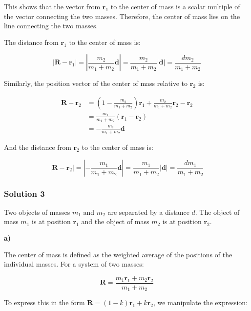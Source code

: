 \documentclass{article}
\begin{document}
This shows that the vector from $\mathbf{r}_1$ to the center of mass is a scalar multiple of the vector connecting the two masses.  Therefore, the center of mass lies on the line connecting the two masses.

The distance from $\mathbf{r}_1$ to the center of mass is:

\begin{equation*}
|\mathbf{R} - \mathbf{r}_1| = \left| \frac{m_2}{m_1 + m_2} \mathbf{d} \right| = \frac{m_2}{m_1 + m_2} |\mathbf{d}| = \frac{dm_2}{m_1 + m_2}
\end{equation*}

Similarly, the position vector of the center of mass relative to $\mathbf{r}_2$ is:

\begin{align*}
\mathbf{R} - \mathbf{r}_2 &= \left( 1 - \frac{m_2}{m_1 + m_2} \right) \mathbf{r}_1 + \frac{m_2}{m_1 + m_2} \mathbf{r}_2 - \mathbf{r}_2 \\
&= \frac{m_1}{m_1 + m_2} (\mathbf{r}_1 - \mathbf{r}_2) \\
&= -\frac{m_1}{m_1 + m_2} \mathbf{d}
\end{align*}

And the distance from $\mathbf{r}_2$ to the center of mass is:

\begin{equation*}
|\mathbf{R} - \mathbf{r}_2| = \left| -\frac{m_1}{m_1 + m_2} \mathbf{d} \right| = \frac{m_1}{m_1 + m_2} |\mathbf{d}| = \frac{dm_1}{m_1 + m_2}
\end{equation*}

\subsubsection{Solution 3}

Two objects of masses $m_1$ and $m_2$ are separated by a distance $d$. The object of mass $m_1$ is at position $\mathbf{r}_1$ and the object of mass $m_2$ is at position $\mathbf{r}_2$.

\textbf{a)} 

The center of mass is defined as the weighted average of the positions of the individual masses.  For a system of two masses:

\begin{equation*}
\mathbf{R} = \frac{m_1 \mathbf{r}_1 + m_2 \mathbf{r}_2}{m_1 + m_2} 
\end{equation*}

To express this in the form $\mathbf{R} = (1 - k)\mathbf{r}_1 + k\mathbf{r}_2$, we manipulate the expression:
\end{document}
